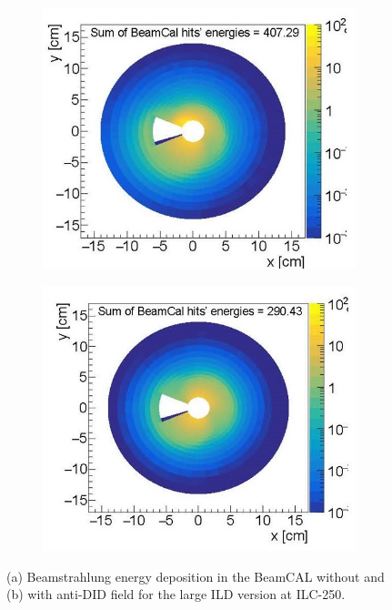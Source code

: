\begin{figure}[t!]
\begin{subfigure}{0.48\textwidth}
\includegraphics[width=1.0\hsize]{Integration/fig/BG_beamcal_a.jpg}
\caption{}
\end{subfigure}
\begin{subfigure}{0.48\textwidth}
\includegraphics[width=1.0\hsize]{Integration/fig/BG_beamcal_b.jpg}
\caption{}
\end{subfigure}
\caption{\label{fig:integration:beamcal}(a) Beamstrahlung energy deposition in the BeamCAL without and (b) with  anti-DID field for the large ILD version at ILC-250. }
\end{figure}

